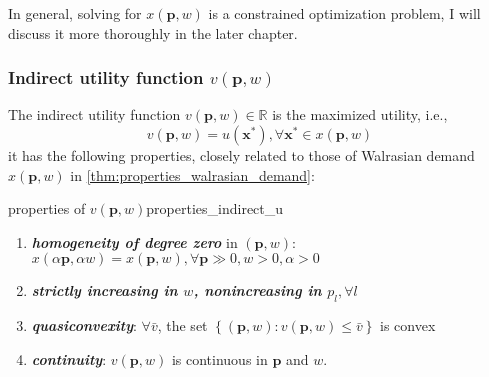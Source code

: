 In general, solving for $ x(\mathbf{p},w)$ is a constrained optimization problem, I will discuss it more thoroughly in the later chapter.

\subsubsection*{Indirect utility function $v(\mathbf{p},w)$}
The indirect utility function $v(\mathbf{p},w)\in \mathbb{R}$ is the maximized utility, i.e., 
$$v(\mathbf{p},w)=u(\mathbf{x}^*),\forall \mathbf{x}^*\in  x(\mathbf{p},w)$$
it has the following properties, closely related to those of Walrasian demand $ x(\mathbf{p},w)$ in \ref{thm:properties_walrasian_demand}:

\begin{theorem}{properties of $v(\mathbf{p},w)$}{properties_indirect_u}
    \begin{enumerate}
        \item \textit{\textbf{homogeneity of degree zero}} in $(\mathbf{p},w)$: $ x(\alpha\mathbf{p},\alpha w)= x(\mathbf{p},w),\forall \mathbf{p}\gg 0,w>0,\alpha>0$
        \item \textit{\textbf{strictly increasing in $w$, nonincreasing in $p_l,\forall l$}}
        \item \textit{\textbf{quasiconvexity}}: $\forall \bar{v}$, the set $\left\{(\mathbf{p},w):v(\mathbf{p},w)\leq \bar{v}\right\}$ is convex
        \item \textit{\textbf{continuity}}: $v(\mathbf{p},w)$ is continuous in $\mathbf{p}$ and $w$.
    \end{enumerate}
\end{theorem}

